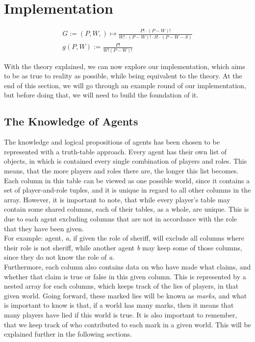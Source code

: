 \section{Implementation}\label{sec:implementation}

\begin{gather}
	G:=(P, W, ) \mapsto \frac{P!\cdot(P-W)!}{W!\cdot(P-W)!\cdot S!\cdot(P-W-S)} \\
	g(P,W) := \frac{P!}{W!(P-W)!}
\end{gather}


With the theory explained, we can now explore our implementation, which aims to 
be as true to reality as possible, while being equivalent to the theory. At the 
end of this section, we will go through an example round of our implementation, 
but before doing that, we will need to build the foundation of it.
\subsection{The Knowledge of Agents}\label{TheKnowledgeOfAgents}
The knowledge and logical propositions of agents has been chosen to be 
represented with a truth-table approach. Every agent has their own 
list of objects, in which is contained every single combination of 
players and roles. This means, that the more players and roles there are, the 
longer this list becomes.\\ 
Each column in this table can be viewed as one possible world, since it 
contains a set of player-and-role tuples, and it is unique in regard to all 
other columns in the array. However, it is important to note, that while every 
player's table may contain some shared columns, each of their tables, as a 
whole, are unique. This is due to each agent excluding columns that are not in 
accordance with the role that they have been given.\\ 
For example: agent, \textit{a}, if given the role of sheriff, will exclude all 
columns where their role is not sheriff, while another agent \textit{b} may 
keep some of those columns, since they do not know the role of \textit{a}.\\
Furthermore, each column also contains data on who have made what claims, and 
whether that claim is true or false in this given column. This is represented 
by a nested array for each columns, which keeps track of the lies of players, 
in that given world. Going forward, these marked lies will be known as 
\textit{marks}, and what is important to know is that, if a world has many 
marks, then it means that many players have lied if this world is true. It is 
also important to remember, that we keep track of who contributed to each mark 
in a given world. This will be explained further in the following sections.

